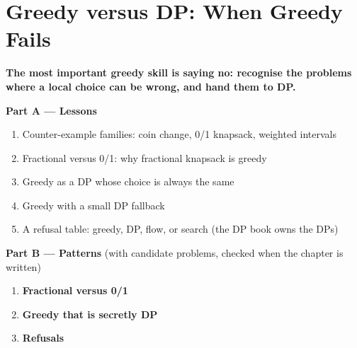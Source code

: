 \chapter{Greedy versus DP: When Greedy Fails}
\label{ch:greedy_vs_dp}

\begin{tcolorbox}[enhanced, colback=white, colframe=secondaryblue, boxrule=1pt, arc=2mm]
\textbf{\large\textcolor{primaryblue}{The most important greedy skill is saying no: recognise the problems where a local choice can be wrong, and hand them to DP.}}
\end{tcolorbox}


\begin{plannedbox}
\textbf{Part A --- Lessons}
\begin{enumerate}[leftmargin=*, label=\textbf{A\arabic*.}, itemsep=1pt]
    \item Counter-example families: coin change, 0/1 knapsack, weighted intervals
    \item Fractional versus 0/1: why fractional knapsack is greedy
    \item Greedy as a DP whose choice is always the same
    \item Greedy with a small DP fallback
    \item A refusal table: greedy, DP, flow, or search (the DP book owns the DPs)
\end{enumerate}
\textbf{Part B --- Patterns} (with candidate problems, checked when the chapter is written)
\begin{enumerate}[leftmargin=*, label=\textbf{P\arabic*.}, itemsep=1pt]
    \item \textbf{Fractional versus 0/1}
    \item \textbf{Greedy that is secretly DP}
    \item \textbf{Refusals}
\end{enumerate}
\end{plannedbox}
